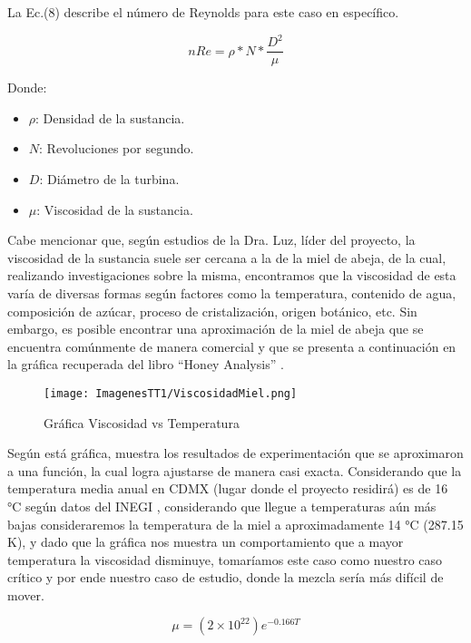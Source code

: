 \documentclass[14pt,oneside]{extarticle} %
\begin{document}
La Ec.(8) describe el número de Reynolds para este caso en específico.

\begin{equation}
    nRe = \rho \ast N \ast \frac{D^2}{\mu}
\end{equation}

Donde:
\begin{itemize}
    \item $\rho$: Densidad de la sustancia.
    \item $N$: Revoluciones por segundo.
    \item $D$: Diámetro de la turbina.
    \item $\mu$: Viscosidad de la sustancia.
\end{itemize}

Cabe mencionar que, según estudios de la Dra. Luz, líder del proyecto, la viscosidad de la sustancia suele ser cercana a la de la miel de abeja, de la cual, realizando investigaciones sobre la misma, encontramos que la viscosidad de esta varía de diversas formas según factores como la temperatura, contenido de agua, composición de azúcar, proceso de cristalización, origen botánico, etc. Sin embargo, es posible encontrar una aproximación de la miel de abeja que se encuentra comúnmente de manera comercial y que se presenta a continuación en la gráfica recuperada del libro “Honey Analysis” \cite{ref29}.

\begin{figure}[H]
    \centering
    \texttt{[image: ImagenesTT1/ViscosidadMiel.png]}
    \caption{Gráfica Viscosidad vs Temperatura}
    \label{fig:Viscosidad_miel}
\end{figure}

Según está gráfica, muestra los resultados de experimentación que se aproximaron a una función, la cual logra ajustarse de manera casi exacta.
Considerando que la temperatura media anual en CDMX (lugar donde el proyecto residirá) es de 16 °C según datos del INEGI \cite{ref30}, considerando que llegue a temperaturas aún más bajas consideraremos la temperatura de la miel a aproximadamente 14 °C (287.15 K), y dado que la gráfica nos muestra un comportamiento que a mayor temperatura la viscosidad disminuye, tomaríamos este caso como nuestro caso crítico y por ende nuestro caso de estudio, donde la mezcla sería más difícil de mover.

\begin{equation}
\mu = (2\times10^{22})e^{-0.166T}
\end{equation}
\end{document}
